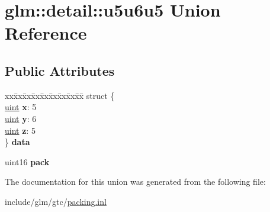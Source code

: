 \hypertarget{unionglm_1_1detail_1_1u5u6u5}{}\section{glm\+:\+:detail\+:\+:u5u6u5 Union Reference}
\label{unionglm_1_1detail_1_1u5u6u5}
\subsection*{Public Attributes}
\begin{DoxyCompactItemize}
\item 
\mbox{\label{unionglm_1_1detail_1_1u5u6u5_ad4670f9777cab7784f9657693d365630}} 
\begin{tabbing}
xx\=xx\=xx\=xx\=xx\=xx\=xx\=xx\=xx\=\kill
struct \{\\
\>\hyperlink{group__core__precision_ga4fd29415871152bfb5abd588334147c8}{uint} {\bfseries x}: 5\\
\>\hyperlink{group__core__precision_ga4fd29415871152bfb5abd588334147c8}{uint} {\bfseries y}: 6\\
\>\hyperlink{group__core__precision_ga4fd29415871152bfb5abd588334147c8}{uint} {\bfseries z}: 5\\
\} {\bfseries data}\\

\end{tabbing}\item 
\mbox{\label{unionglm_1_1detail_1_1u5u6u5_a5ea89c1a491b7e1442cad93d92628b2e}} 
uint16 {\bfseries pack}
\end{DoxyCompactItemize}


The documentation for this union was generated from the following file\+:\begin{DoxyCompactItemize}
\item 
include/glm/gtc/\hyperlink{packing_8inl}{packing.\+inl}\end{DoxyCompactItemize}
